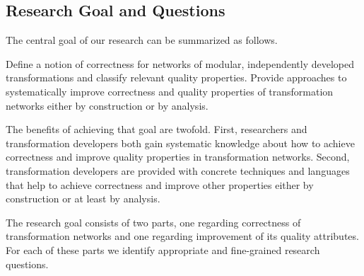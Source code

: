 \subsection{Research Goal and Questions}

The central goal of our research can be summarized as follows.
\begin{researchgoal}
Define a notion of correctness for networks of modular, independently developed transformations and classify relevant quality properties.
Provide approaches to systematically improve correctness and quality properties of transformation networks either by construction or by analysis.
\end{researchgoal}

The benefits of achieving that goal are twofold.
First, researchers and transformation developers both gain systematic knowledge about how to achieve correctness and improve quality properties in transformation networks.
Second, transformation developers are provided with concrete techniques and languages that help to achieve correctness and improve other properties either by construction or at least by analysis.

The research goal consists of two parts, one regarding correctness of transformation networks and one regarding improvement of its quality attributes.
For each of these parts we identify appropriate and fine-grained research questions.




